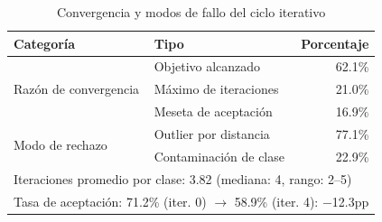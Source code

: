 \begin{table}[htbp]
\centering
\caption{Convergencia y modos de fallo del ciclo iterativo}
\label{tab:closed_loop_convergence}
\begin{tabular}{llr}
\toprule
\textbf{Categoría} & \textbf{Tipo} & \textbf{Porcentaje} \\
\midrule
\multirow{3}{*}{Razón de convergencia}
 & Objetivo alcanzado     & 62.1\% \\
 & Máximo de iteraciones  & 21.0\% \\
 & Meseta de aceptación   & 16.9\% \\
\midrule
\multirow{2}{*}{Modo de rechazo}
 & Outlier por distancia   & 77.1\% \\
 & Contaminación de clase  & 22.9\% \\
\midrule
\multicolumn{3}{l}{\small Iteraciones promedio por clase: 3.82 (mediana: 4, rango: 2--5)} \\
\multicolumn{3}{l}{\small Tasa de aceptación: 71.2\% (iter. 0) $\to$ 58.9\% (iter. 4): $-$12.3pp} \\
\bottomrule
\end{tabular}
\end{table}

